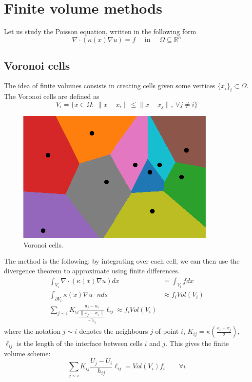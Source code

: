 \documentclass[12pt, openany]{report}
\newcommand{\R}{\mathbb{R}}
\theoremstyle{definition}
\begin{document}
\section{Finite volume methods}
Let us study the Poisson equation, written in the following form
\begin{equation}
	\nabla \cdot (\kappa(x)\nabla u) = f \quad \text{   in   }\quad  \Omega \subseteq \R^n
\end{equation}
\subsection{Voronoi cells}
The idea of finite volumes consists in creating cells given some vertices $\{x_i\}_i \subset \Omega$. The Voronoi cells are defined as 
\begin{equation}
	V_i = \{x\in \Omega:\ \|x-x_i\| \le \|x-x_j\| ,\ \forall j\neq i\}
\end{equation}
\begin{figure}[H]
	\centering
	\includegraphics[width = .5\textwidth]{img/voronoi.png}
	\caption{Voronoi cells.}
	\label{fig:voronoi}
\end{figure}
The method is the following: by integrating over each cell, we can then use the divergence theorem to approximate using finite differences. 
\begin{equation}
	\begin{aligned}
		\int_{V_i} \nabla \cdot (\kappa(x)\nabla u)dx &= \int_{V_i} fdx \\
		\int_{\partial V_i}\kappa(x)\nabla u\cdot n ds&\approx f_i Vol(V_i)\\
		\sum_{j\sim i}K_{ij}\frac{u_j-u_i}{\underbrace{\|x_j-x_i\|}_{\eqqcolon h_{ij}}} \ell_{ij} \approx f_i Vol(V_i)
	\end{aligned}
\end{equation}
where the notation $j\sim i$ denotes the neighbours $j$ of point $i$, $K_{ij} = \kappa \left(\frac{x_i+x_j}{2}\right)$, $\ell_{ij}$ is the length of the interface between cells $i$ and $j$. This gives the finite volume scheme:
\begin{equation}
	\sum_{j\sim i} K_{ij} \frac{U_j-U_i}{h_{ij}} \ell_{ij} = Vol(V_i)f_i \qquad \forall i
\end{equation}
\end{document}
